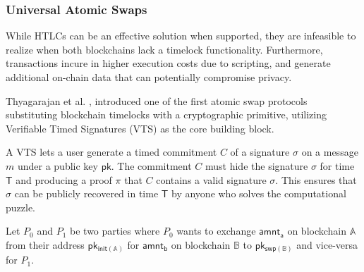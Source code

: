 \documentclass{article}      	%
\begin{document}
%

\subsubsection{Universal Atomic Swaps}


While HTLCs can be an effective solution when supported, they are infeasible to realize when both blockchains lack a timelock functionality. Furthermore, transactions incure in higher execution costs due to scripting, and generate additional on-chain data that can potentially compromise privacy.

Thyagarajan et al. \cite{uas}, introduced one of the first atomic swap protocols substituting blockchain timelocks with a cryptographic primitive, utilizing Verifiable Timed Signatures (VTS) \cite{vts} as the core building block.

A VTS lets a user generate a timed commitment $C$ of a signature $\sigma$ on a message $m$ under a public key $\mathsf{pk}$. The commitment $C $ must hide the signature $\sigma$ for time $\mathsf{T}$ and producing a proof $\pi$ that $C$ contains a valid signature $\sigma$. This ensures that $\sigma$ can be publicly recovered in time $\mathsf{T}$ by anyone who solves the computational puzzle.

Let $P_0$ and $P_1$ be two parties where $P_0$ wants to exchange $\mathsf{amnt_a}$ on blockchain $\mathbb{A}$ from their address $\mathsf{pk_{init(\mathbb{A})}}$ for $\mathsf{amnt_b}$ on blockchain $\mathbb{B}$ to $\mathsf{pk_{swp(\mathbb{B})}}$ and vice-versa for $P_1$.
\end{document}

